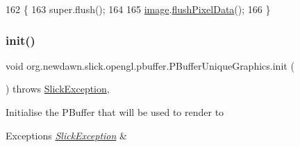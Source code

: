 \begin{DoxyCode}
162                         \{
163         super.flush();
164         
165         \mbox{\hyperlink{classorg_1_1newdawn_1_1slick_1_1opengl_1_1pbuffer_1_1_p_buffer_unique_graphics_abc5d45be7087d1aeb486c2fae5c194ca}{image}}.\mbox{\hyperlink{classorg_1_1newdawn_1_1slick_1_1_image_ae8ba5dcbbaef48c9ee618f8c68aa1b12}{flushPixelData}}();
166     \}
\end{DoxyCode}
\mbox{\label{classorg_1_1newdawn_1_1slick_1_1opengl_1_1pbuffer_1_1_p_buffer_unique_graphics_ad2c4549df1e2d1bb805ab1968000cbe6}} 
\subsubsection{\texorpdfstring{init()}{init()}}
{\footnotesize\ttfamily void org.\+newdawn.\+slick.\+opengl.\+pbuffer.\+P\+Buffer\+Unique\+Graphics.\+init (\begin{DoxyParamCaption}{ }\end{DoxyParamCaption}) throws \mbox{\hyperlink{classorg_1_1newdawn_1_1slick_1_1_slick_exception}{Slick\+Exception}}\hspace{0.3cm}{\ttfamily [inline]}, {\ttfamily [private]}}

Initialise the P\+Buffer that will be used to render to


\begin{DoxyExceptions}{Exceptions}
{\em \mbox{\hyperlink{classorg_1_1newdawn_1_1slick_1_1_slick_exception}{Slick\+Exception}}} & \\
\hline
\end{DoxyExceptions}

